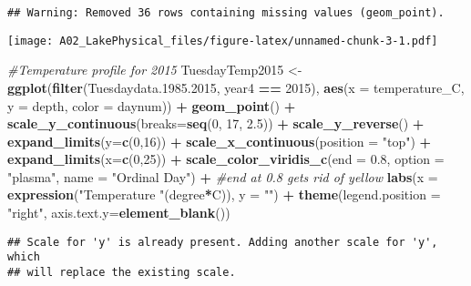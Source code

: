 \documentclass[]{article}
\newenvironment{Shaded}{\begin{snugshade}}{\end{snugshade}}
\newcommand{\CommentTok}[1]{\textcolor[rgb]{0.56,0.35,0.01}{\textit{#1}}}
\newcommand{\DataTypeTok}[1]{\textcolor[rgb]{0.13,0.29,0.53}{#1}}
\newcommand{\DecValTok}[1]{\textcolor[rgb]{0.00,0.00,0.81}{#1}}
\newcommand{\FloatTok}[1]{\textcolor[rgb]{0.00,0.00,0.81}{#1}}
\newcommand{\KeywordTok}[1]{\textcolor[rgb]{0.13,0.29,0.53}{\textbf{#1}}}
\newcommand{\NormalTok}[1]{#1}
\newcommand{\OperatorTok}[1]{\textcolor[rgb]{0.81,0.36,0.00}{\textbf{#1}}}
\newcommand{\StringTok}[1]{\textcolor[rgb]{0.31,0.60,0.02}{#1}}
\begin{document}
\begin{verbatim}
## Warning: Removed 36 rows containing missing values (geom_point).
\end{verbatim}

\texttt{[image: A02\_LakePhysical\_files/figure-latex/unnamed-chunk-3-1.pdf]}

\begin{Shaded}
\begin{Highlighting}[]
\CommentTok{#Temperature profile for 2015}
\NormalTok{TuesdayTemp2015 <-}\StringTok{ }
\StringTok{  }\KeywordTok{ggplot}\NormalTok{(}\KeywordTok{filter}\NormalTok{(Tuesdaydata.}\FloatTok{1985.2015}\NormalTok{, year4 }\OperatorTok{==}\StringTok{ }\DecValTok{2015}\NormalTok{), }\KeywordTok{aes}\NormalTok{(}\DataTypeTok{x =}\NormalTok{ temperature_C, }\DataTypeTok{y =}\NormalTok{ depth, }\DataTypeTok{color =}\NormalTok{ daynum)) }\OperatorTok{+}
\StringTok{  }\KeywordTok{geom_point}\NormalTok{() }\OperatorTok{+}
\StringTok{  }\KeywordTok{scale_y_continuous}\NormalTok{(}\DataTypeTok{breaks=}\KeywordTok{seq}\NormalTok{(}\DecValTok{0}\NormalTok{, }\DecValTok{17}\NormalTok{, }\FloatTok{2.5}\NormalTok{)) }\OperatorTok{+}
\StringTok{  }\KeywordTok{scale_y_reverse}\NormalTok{() }\OperatorTok{+}
\StringTok{  }\KeywordTok{expand_limits}\NormalTok{(}\DataTypeTok{y=}\KeywordTok{c}\NormalTok{(}\DecValTok{0}\NormalTok{,}\DecValTok{16}\NormalTok{)) }\OperatorTok{+}
\StringTok{  }\KeywordTok{scale_x_continuous}\NormalTok{(}\DataTypeTok{position =} \StringTok{"top"}\NormalTok{) }\OperatorTok{+}
\StringTok{  }\KeywordTok{expand_limits}\NormalTok{(}\DataTypeTok{x=}\KeywordTok{c}\NormalTok{(}\DecValTok{0}\NormalTok{,}\DecValTok{25}\NormalTok{)) }\OperatorTok{+}
\StringTok{  }\KeywordTok{scale_color_viridis_c}\NormalTok{(}\DataTypeTok{end =} \FloatTok{0.8}\NormalTok{, }\DataTypeTok{option =} \StringTok{"plasma"}\NormalTok{, }\DataTypeTok{name =} \StringTok{"Ordinal Day"}\NormalTok{) }\OperatorTok{+}\StringTok{  }\CommentTok{#end at 0.8 gets rid of yellow}
\StringTok{  }\KeywordTok{labs}\NormalTok{(}\DataTypeTok{x =} \KeywordTok{expression}\NormalTok{(}\StringTok{"Temperature "}\NormalTok{(degree}\OperatorTok{*}\NormalTok{C)), }\DataTypeTok{y =} \StringTok{""}\NormalTok{) }\OperatorTok{+}
\StringTok{  }\KeywordTok{theme}\NormalTok{(}\DataTypeTok{legend.position =} \StringTok{"right"}\NormalTok{, }\DataTypeTok{axis.text.y=}\KeywordTok{element_blank}\NormalTok{())}
\end{Highlighting}
\end{Shaded}

\begin{verbatim}
## Scale for 'y' is already present. Adding another scale for 'y', which
## will replace the existing scale.
\end{verbatim}
\end{document}
